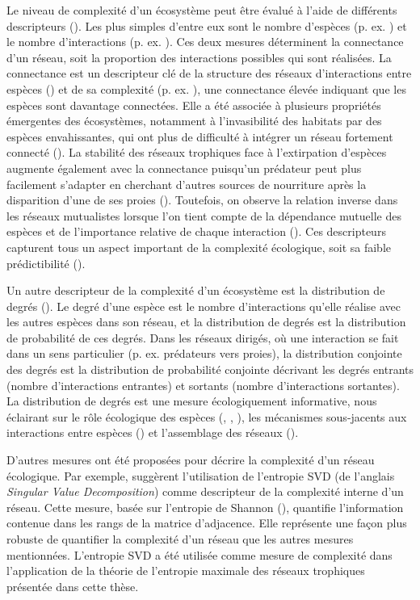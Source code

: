 Le niveau de complexité d'un écosystème peut être évalué à l'aide de différents
descripteurs (\cite{Landi2018Complexity}). Les plus simples d'entre eux sont le
nombre d'espèces (p. ex. \cite{May1972Will}) et le nombre d'interactions (p. ex.
\cite{Okuyama2008Network}). Ces deux mesures déterminent la connectance d'un
réseau, soit la proportion des interactions possibles qui sont réalisées. La
connectance est un descripteur clé de la structure des réseaux d'interactions
entre espèces (\cite{Martinez1992Constant}) et de sa complexité (p. ex.
\cite{Rozdilsky2001Complexity}), une connectance élevée indiquant que les
espèces sont davantage connectées. Elle a été associée à plusieurs propriétés
émergentes des écosystèmes, notamment à l'invasibilité des habitats par des
espèces envahissantes, qui ont plus de difficulté à intégrer un réseau fortement
connecté (\cite{Smith-Ramesh2017Global}). La stabilité des réseaux trophiques
face à l'extirpation d'espèces augmente également avec la connectance puisqu'un
prédateur peut plus facilement s'adapter en cherchant d'autres sources de
nourriture après la disparition d'une de ses proies (\cite{Dunne2002Network}).
Toutefois, on observe la relation inverse dans les réseaux mutualistes lorsque
l'on tient compte de la dépendance mutuelle des espèces et de l'importance
relative de chaque interaction (\cite{Vieira2015Simple}). Ces descripteurs
capturent tous un aspect important de la complexité écologique, soit sa faible
prédictibilité (\cite{Strydom2021Svd}). 

Un autre descripteur de la complexité d'un écosystème est la distribution de
degrés (\cite{Landi2018Complexity}). Le degré d'une espèce est le nombre
d'interactions qu'elle réalise avec les autres espèces dans son réseau, et la
distribution de degrés est la distribution de probabilité de ces degrés. Dans
les réseaux dirigés, où une interaction se fait dans un sens particulier (p. ex.
prédateurs vers proies), la distribution conjointe des degrés est la
distribution de probabilité conjointe décrivant les degrés entrants (nombre
d'interactions entrantes) et sortants (nombre d'interactions sortantes). La
distribution de degrés est une mesure écologiquement informative, nous éclairant
sur le rôle écologique des espèces (\cite{Sole2001Complexity},
\cite{Dunne2002Network}, \cite{Memmott2004Tolerance}), les mécanismes
sous-jacents aux interactions entre espèces (\cite{Williams2011Biology}) et
l'assemblage des réseaux (\cite{Vazquez2005Degree}).

D'autres mesures ont été proposées pour décrire la complexité d'un réseau
écologique. Par exemple, \textcite{Strydom2021Svd} suggèrent l'utilisation de
l'entropie SVD (de l'anglais \textit{Singular Value Decomposition}) comme
descripteur de la complexité interne d'un réseau. Cette mesure, basée sur
l'entropie de Shannon (\cite{Shannon1948Mathematical}), quantifie l'information
contenue dans les rangs de la matrice d'adjacence. Elle représente une façon
plus robuste de quantifier la complexité d'un réseau que les autres mesures
mentionnées. L'entropie SVD a été utilisée comme mesure de complexité dans
l'application de la théorie de l'entropie maximale des réseaux trophiques
présentée dans cette thèse. 

